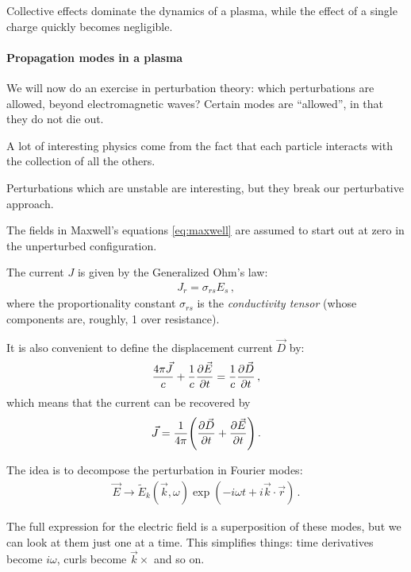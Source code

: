 \documentclass[main.tex]{subfiles}
\begin{document}

Collective effects dominate the dynamics of a plasma, while the effect of a single charge quickly becomes negligible.

\paragraph{Propagation modes in a plasma}

We will now do an exercise in perturbation theory: which perturbations are allowed, beyond electromagnetic waves? 
Certain modes are ``allowed'', in that they do not die out. 

A lot of interesting physics come from the fact that each particle interacts with the collection of all the others. 

Perturbations which are unstable are interesting, but they break our perturbative approach. 

The fields in Maxwell's equations \eqref{eq:maxwell} are assumed to start out at zero in the unperturbed configuration. 

The current \(J\) is given by the Generalized Ohm's law: 
%
\begin{align}
J_r = \sigma_{rs} E_s 
\,,
\end{align}
%
where the proportionality constant \(\sigma _{rs}\) is the \emph{conductivity tensor} (whose components are, roughly, 1 over resistance). 

It is also convenient to define the displacement current \(\vec{D}\) by:
%
\begin{align}
\frac{4 \pi \vec{J}}{c} + \frac{1}{c} \pdv{\vec{E}}{t} = \frac{1}{c} \pdv{\vec{D}}{t}
\,,
\end{align}
%
which means that the current can be recovered by 
%
\begin{align}
\vec{J} = \frac{1}{4 \pi } \qty(\pdv{\vec{D}}{t} + \pdv{\vec{E}}{t})
\,.
\end{align}

The idea is to decompose the perturbation in Fourier modes:
%
\begin{align}
 \vec{E} \to \widetilde{E}_k (\vec{k}, \omega ) \exp(- i \omega t + i \vec{k} \cdot \vec{r})
\,.
\end{align}

The full expression for the electric field is a superposition of these modes, but we can look at them just one at a time. 
This simplifies things: time derivatives become \(i \omega \), curls become \(\vec{k} \times \) and so on. 
\end{document}
